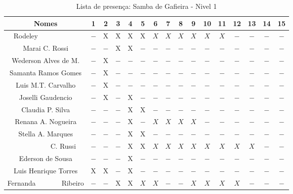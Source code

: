 \documentclass[a4paper,12pt]{article}
\begin{document}
\begin{landscape}
\begin{table}[!htbp]
\begin{tabular}{|*{16}{c|}}
 \hline
\end{tabular}
\label{actividades}
\end{table}

\begin{table}[!htbp]
\vspace*{-2cm}\centering
\caption{Lista de presença: Samba de Gafieira - Nivel 1}
\begin{tabular}{|*{16}{c|}}
\hline%
 Nomes                                     & 1  & 2  & 3  & 4  & 5  & 6   & 7   & 8   & 9   & 10  & 11  & 12  & 13  & 14  & 15  \\ \hline
 \LARGE Rodeley$~~~~~~~~~~~~~~~~~~~~~~~~~~$&$-$ &X   &X   &X   &X   &$X$  &$X$  &$X$  &$X$  &$X$  &$X$  &$-$  &$-$  &$-$  &$-$  \\ \hline
 \LARGE Marai  C. Rossi                    &$-$ &$-$ &X   &X   &$-$ &$-$  &$-$  &$-$  &$-$  &$-$  &$-$  &$-$  &$-$  &$-$  &$-$  \\ \hline
 \LARGE Wederson Alves de M.               &$-$ &X   &$-$ &$-$ &$-$ &$-$  &$-$  &$-$  &$-$  &$-$  &$-$  &$-$  &$-$  &$-$  &$-$  \\ \hline
 \LARGE Samanta Ramos Gomes                &$-$ &X   &$-$ &$-$ &$-$ &$-$  &$-$  &$-$  &$-$  &$-$  &$-$  &$-$  &$-$  &$-$  &$-$  \\ \hline
 \LARGE Luis M.T. Carvalho                 &$-$ &X   &$-$ &$-$ &$-$ &$-$  &$-$  &$-$  &$-$  &$-$  &$-$  &$-$  &$-$  &$-$  &$-$  \\ \hline
 \LARGE Joselli Gaudencio                  &$-$ &X   &$-$ &X   &$-$ &$-$  &$-$  &$-$  &$-$  &$-$  &$-$  &$-$  &$-$  &$-$  &$-$  \\ \hline
 \LARGE Claudia P. Silva                   &$-$ &$-$ &$-$ &X   &X   &$-$  &$-$  &$-$  &$-$  &$-$  &$-$  &$-$  &$-$  &$-$  &$-$  \\ \hline
 \LARGE Renana A. Nogueira                 &$-$ &$-$ &$-$ &X   &$-$ &$X$  &$X$  &$X$  &$X$  &$-$  &$-$  &$-$  &$-$  &$-$  &$-$  \\ \hline
 \LARGE Stella A. Marques                  &$-$ &$-$ &$-$ &X   &X   &$-$  &$-$  &$-$  &$-$  &$-$  &$-$  &$-$  &$-$  &$-$  &$-$  \\ \hline
 \LARGE $~~~~~~~~~~~~~~~~~~~~~~~$C. Russi  &$-$ &$-$ &$-$ &X   &X   &$X$  &$X$  &$X$  &$X$  &$X$  &$X$  &$X$  &$X$  &$-$  &$-$  \\ \hline
 \LARGE Ederson de Sousa                   &$-$ &$-$ &$-$ &X   &$-$ &$-$  &$-$  &$-$  &$-$  &$-$  &$-$  &$-$  &$-$  &$-$  &$-$  \\ \hline
 \LARGE Luis Henrique Torres               &X   &X   &$-$ &X   &$-$ &$-$  &$-$  &$-$  &$-$  &$-$  &$-$  &$-$  &$-$  &$-$  &$-$  \\ \hline
 \LARGE Fernanda $~~~~~~~~~~~~~~$ Ribeiro  &$-$ &$-$ &X   &X   &$X$ &$X$  &$-$  &$-$  &$X$  &$X$  &$X$  &$X$  &$-$  &$-$  &$-$  \\ \hline
 \hline
\end{tabular}
\label{actividades2}
\end{table}


\end{landscape}
\end{document}
